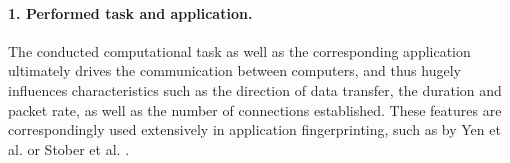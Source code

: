 

 
\paragraph{1. Performed task and application.}
The conducted computational task as well as the corresponding application ultimately drives the communication between computers, and thus hugely influences characteristics such as the direction of data transfer, the duration and packet rate, as well as the number of connections established. These features are correspondingly used extensively in application fingerprinting, such as by Yen et al. \cite{yen2009browser} or Stober et al. \cite{stober2013you}. %

